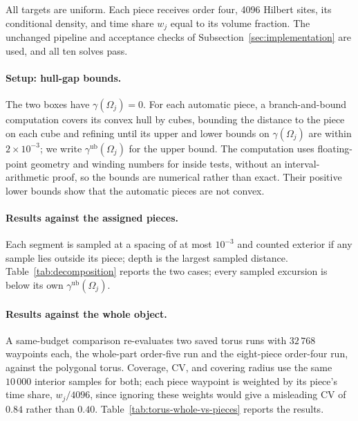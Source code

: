 All targets are uniform. Each piece receives order four, 4096 Hilbert sites, its conditional density, and time share $w_j$ equal to its volume fraction. The unchanged pipeline and acceptance checks of Subsection~\ref{sec:implementation} are used, and all ten solves pass.

\paragraph{Setup: hull-gap bounds.}
The two boxes have $\gamma(\Omega_j)=0$. For each automatic piece, a branch-and-bound computation covers its convex hull by cubes, bounding the distance to the piece on each cube and refining until its upper and lower bounds on $\gamma(\Omega_j)$ are within $2\times10^{-3}$; we write $\gamma^{\mathrm{ub}}(\Omega_j)$ for the upper bound. The computation uses floating-point geometry and winding numbers for inside tests, without an interval-arithmetic proof, so the bounds are numerical rather than exact. Their positive lower bounds show that the automatic pieces are not convex.

\paragraph{Results against the assigned pieces.}
Each segment is sampled at a spacing of at most $10^{-3}$ and counted exterior if any sample lies outside its piece; depth is the largest sampled distance. Table~\ref{tab:decomposition} reports the two cases; every sampled excursion is below its own $\gamma^{\mathrm{ub}}(\Omega_j)$.



\paragraph{Results against the whole object.}
\label{sec:experiments-torus-comparison}
A same-budget comparison re-evaluates two saved torus runs with $32\,768$ waypoints each, the whole-part order-five run and the eight-piece order-four run, against the polygonal torus. Coverage, CV, and covering radius use the same $10\,000$ interior samples for both; each piece waypoint is weighted by its piece's time share, $w_j/4096$, since ignoring these weights would give a misleading CV of $0.84$ rather than $0.40$. Table~\ref{tab:torus-whole-vs-pieces} reports the results.


